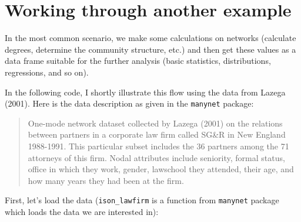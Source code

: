 \documentclass[
]{book}
\begin{document}
\section*{\texorpdfstring{\textbf{Working through another example}}{Working through another example}}\label{working-through-another-example}

In the most common scenario, we make some calculations on networks (calculate degrees, determine the community structure, etc.) and then get these values as a data frame suitable for the further analysis (basic statistics, distributions, regressions, and so on).

In the following code, I shortly illustrate this flow using the data from Lazega (2001). Here is the data description as given in the \texttt{manynet} package:

\begin{quote}
One-mode network dataset collected by Lazega (2001) on the relations between partners in a corporate law firm called SG\&R in New England 1988-1991. This particular subset includes the 36 partners among the 71 attorneys of this firm. Nodal attributes include seniority, formal status, office in which they work, gender, lawschool they attended, their age, and how many years they had been at the firm.
\end{quote}

First, let's load the data (\texttt{ison\_lawfirm} is a function from \texttt{manynet} package which loads the data we are interested in):
\end{document}
